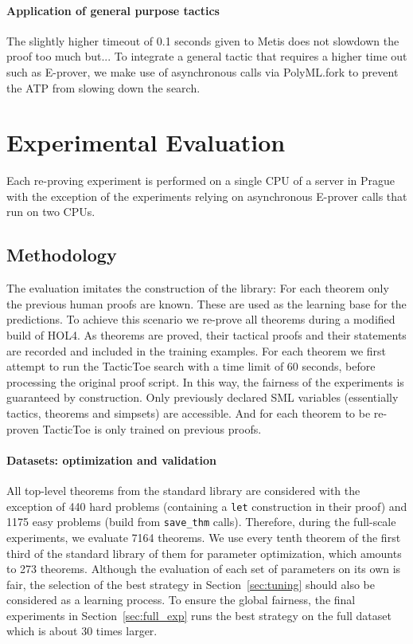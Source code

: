 \documentclass[runningheads,a4paper,draft]{svjour3}
\def\holfour{\textsf{HOL4}\xspace}
\def\eprover{\textsf{E-prover}\xspace}
\def\sml{\textsf{SML}\xspace}
\def\metis{\textsf{Metis}\xspace}
\def\tactictoe{\textsf{TacticToe}\xspace}
\begin{document}
\paragraph{Application of general purpose tactics}
The slightly higher timeout of 0.1 seconds given to \metis does not slowdown 
the proof too much but...
To integrate a general tactic that requires a higher time out such as \eprover, 
we make use of asynchronous calls via PolyML.fork to prevent the ATP 
from slowing down the search. 

\section{Experimental Evaluation}\label{s:experiments}
Each re-proving experiment is performed on a single CPU of a server in Prague 
with the exception of the experiments 
relying on asynchronous \eprover calls that run on two CPUs.


\subsection{Methodology} 
The evaluation imitates the construction of the library: For each theorem only 
the previous human proofs are known. These are used as the learning base for 
the predictions.
To achieve this scenario we re-prove all theorems during a modified build of 
\holfour.
As theorems are proved, their tactical proofs and their statements are 
recorded and included in the training examples.
For each theorem we first attempt to run the \tactictoe search with a time 
limit of 60 seconds, before processing the original proof script.
In this way, the fairness of the experiments is guaranteed by construction. 
Only previously declared \sml 
variables (essentially tactics, theorems and simpsets) are accessible. 
And for each theorem to be re-proven \tactictoe is only trained on previous 
proofs.

\paragraph{Datasets: optimization and validation}
All top-level theorems from the standard library are considered with the 
exception of 440 hard problems (containing a \texttt{let} construction in their 
proof) and 1175 easy problems (build from \texttt{save\_thm} calls). 
Therefore, during the full-scale experiments, we evaluate 7164 theorems.
We use every tenth theorem of the first third of the standard library of 
them for parameter optimization, which amounts to 273 theorems.
Although the evaluation of each set of parameters on its own is fair, 
the selection of the best strategy in Section~\ref{sec:tuning} should also be 
considered as a learning process. To ensure the global fairness, the final 
experiments in Section~\ref{sec:full_exp} runs the best strategy on the full 
dataset which is about 30 times larger.
\end{document}
